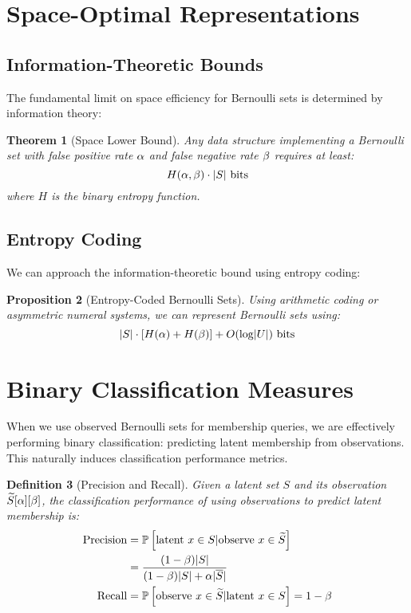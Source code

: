 \documentclass[11pt,final,hidelinks]{article}
\newtheorem{theorem}{Theorem}[section]
\newtheorem{proposition}[theorem]{Proposition}
\newtheorem{definition}[theorem]{Definition}
\begin{document}
\section{Space-Optimal Representations}

\subsection{Information-Theoretic Bounds}

The fundamental limit on space efficiency for Bernoulli sets is determined by information theory:

\begin{theorem}[Space Lower Bound]
Any data structure implementing a Bernoulli set with false positive rate $\alpha$ and false negative rate $\beta$ requires at least:
\begin{equation}
H(\alpha, \beta) \cdot \lvert S\rvert \text{ bits}
\end{equation}
where $H$ is the binary entropy function.
\end{theorem}

\subsection{Entropy Coding}

We can approach the information-theoretic bound using entropy coding:

\begin{proposition}[Entropy-Coded Bernoulli Sets]
Using arithmetic coding or asymmetric numeral systems, we can represent Bernoulli sets using:
\begin{equation}
\lvert S\rvert \cdot [H(\alpha) + H(\beta)] + O(\log \lvert U\rvert) \text{ bits}
\end{equation}
\end{proposition}

\section{Binary Classification Measures}

When we use observed Bernoulli sets for membership queries, we are effectively performing binary classification: predicting latent membership from observations. This naturally induces classification performance metrics.

\begin{definition}[Precision and Recall]
Given a latent set $S$ and its observation $\widetilde{S}[\alpha][\beta]$, the classification performance of using observations to predict latent membership is:
\begin{align}
\text{Precision} &= \mathbb{P}\left[\text{latent } x \in S | \text{observe } x \in \widetilde{S}\right] \\
&= \frac{(1-\beta)\lvert S\rvert}{(1-\beta)\lvert S\rvert + \alpha\lvert\overline{S}\rvert} \\
\text{Recall} &= \mathbb{P}\left[\text{observe } x \in \widetilde{S} | \text{latent } x \in S\right] = 1 - \beta
\end{align}
\end{definition}
\end{document}
